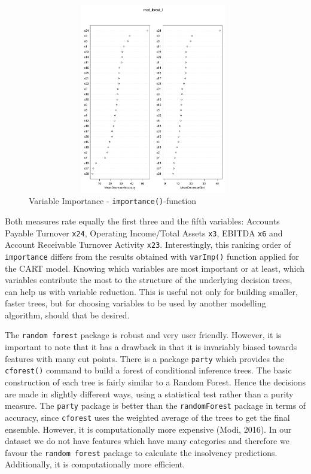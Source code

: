 \documentclass{article}
\begin{document}
\begin{figure}[H]
\begin{center}
\caption{Variable Importance - \texttt{importance()}-function}
\includegraphics[scale=1, height=8.3cm, width=11cm]{../Random_Forest/Rplot.pdf}
\end{center}
\end{figure}

Both measures rate equally the first three and the fifth variables: Accounts Payable Turnover \texttt{x24}, Operating Income/Total Assets \texttt{x3}, EBITDA \texttt{x6} and Account Receivable Turnover Activity \texttt{x23}. Interestingly, this ranking order of \texttt{importance} differs from the results obtained with \texttt{varImp()} function applied for the CART model. Knowing which variables are most important or at least, which variables contribute the most to the structure of the underlying decision trees, can help us with variable reduction. This is useful not only for building smaller, faster trees, but for choosing variables to be used by another modelling algorithm, should that be desired.

The \texttt{random forest} package is robust and very user friendly. However, it is important to note that it has a drawback in that it is invariably biased towards features with many cut points. There is a package \texttt{party} which provides the \texttt{cforest()} command to build a forest of conditional inference trees. The basic construction of each tree is fairly similar to a Random Forest. Hence the decisions are made in slightly different ways, using a statistical test rather than a purity measure. The \texttt{party} package is better than the \texttt{randomForest} package in terms of accuracy, since \texttt{cforest} uses the weighted average of the trees to get the final ensemble. However, it is computationally more expensive (Modi, 2016). In our dataset we do not have features which have many categories and therefore we favour the \texttt{random forest} package to calculate the insolvency predictions. Additionally, it is computationally more efficient.
\end{document}
